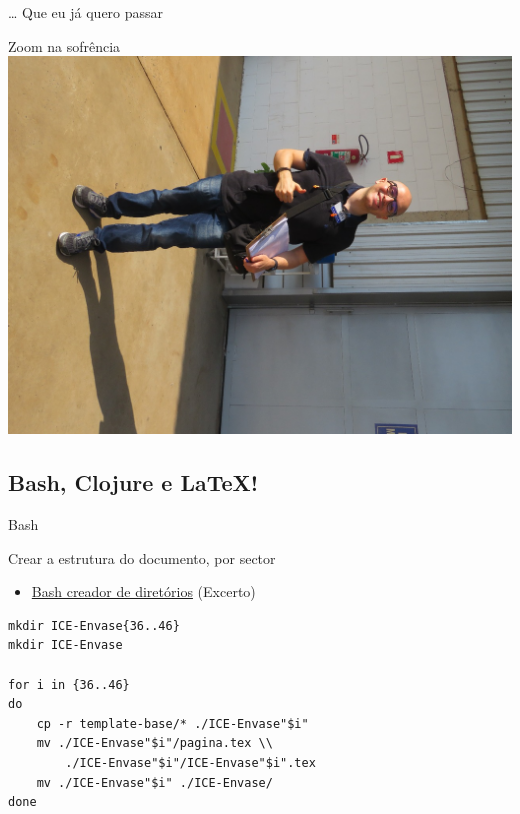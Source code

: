 \documentclass[bigger]{beamer}
\begin{document}
{\begin{frame}[label={sec:org8137463}]{\ldots{} Que eu já quero passar}
\begin{block}{Zoom na sofrência}
\centering
\href{img/lupo-sem-mascara.jpeg}{\includegraphics[height=0.6\textheight,angle=90]{./img/lupo-sem-mascara.jpeg}}
\end{block}
\end{frame}

\subsection{Bash, Clojure e \LaTeX{}!}
\label{sec:orgd59a1c9}
\begin{frame}[label={sec:orgf2975cb},fragile]{Bash}
 \begin{block}{Crear a estrutura do documento, por sector}
\begin{itemize}
\item \href{file:///home/buddhilw/PP/LaTeX/Wagner/Lupo/create-dir.sh}{Bash creador de diretórios} (Excerto)
\end{itemize}

\begin{verbatim}
mkdir ICE-Envase{36..46}
mkdir ICE-Envase

for i in {36..46}
do
    cp -r template-base/* ./ICE-Envase"$i"
    mv ./ICE-Envase"$i"/pagina.tex \\
	    ./ICE-Envase"$i"/ICE-Envase"$i".tex
    mv ./ICE-Envase"$i" ./ICE-Envase/
done
\end{verbatim}
\end{block}
\end{frame}

}
\end{document}

